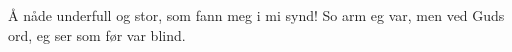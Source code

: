 Å nåde underfull og stor,
som fann meg i mi synd!
So arm eg var, men ved Guds ord,
eg ser som før var blind. 
